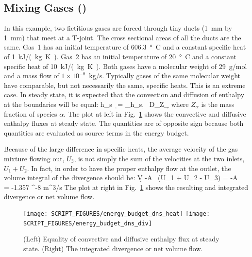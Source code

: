 \documentclass[11pt]{book}
\begin{document}
\subsection{Mixing Gases (\texorpdfstring{}{energy\_budget\_dns})}
\label{energy_budget_dns_100}

In this example, two fictitious gases are forced through tiny ducts (1~mm by 1~mm) that meet at a T-joint. The cross sectional areas of all the ducts are the same. Gas~1 has an initial temperature of 606.3~\si{\degree C} and a constant specific heat of 1~\si{kJ/(kg.K)}. Gas~2 has an initial temperature of 20~\si{\degree C} and a constant specific heat of 10~\si{kJ/(kg.K)}. Both gases have a molecular weight of 29~g/mol and a mass flow of $1 \times 10^{-8}$~kg/s. Typically gases of the same molecular weight have comparable, but not necessarily the same, specific heats. This is an extreme case. In steady state, it is expected that the convection and diffusion of enthalpy at the boundaries will be equal:
\be \int h_{\rm s} \, \rho \bu \cdot \d\bS = \sum_\alpha \int h_{s,\alpha} \, \rho D_\alpha \nabla Z_\alpha \cdot \d\bS \ee
where $Z_\alpha$ is the mass fraction of species $\alpha$.  The plot at left in Fig.~\ref{energy_budget_dns} shows the convective and diffusive enthalpy fluxes at steady state. The quantities are of opposite sign because both quantities are evaluated as source terms in the energy budget.

Because of the large difference in specific heats, the average velocity of the gas mixture flowing out, $U_3$, is not simply the sum of the velocities at the two inlets, $U_1+U_2$. In fact, in order to have the proper enthalpy flow at the outlet, the volume integral of the divergence should be:
\be \int \nabla \cdot \bu \; \d V \equiv -A \, (U_1 + U_2 - U_3) = -A \,  = -1.357 ^{-8} \; \hbox{m}^3/\hbox{s} \label{div2} \ee
The plot at right in Fig.~\ref{energy_budget_dns} shows the resulting and integrated divergence or net volume flow.

\begin{figure}[ht]
\texttt{[image: SCRIPT\_FIGURES/energy\_budget\_dns\_heat]}
\texttt{[image: SCRIPT\_FIGURES/energy\_budget\_dns\_div]}
\caption[The  test case]{(Left) Equality of convective and diffusive enthalpy flux at steady state. (Right) The integrated divergence or net volume flow.}
\label{energy_budget_dns}
\end{figure}
\end{document}
